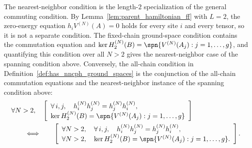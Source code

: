 \begin{remark}
    \label{rem:nncph_ground_spaces_decomposition}
    \leanok
    The nearest-neighbor condition is the length-$2$ specialization of the
    general commuting condition. By Lemma~\ref{lem:parent_hamiltonian_ff}
    with $L=2$, the zero-energy equation $h_iV^{(N)}(A)=0$ holds for every
    site $i$ and every tensor, so it is not a separate condition. The
    fixed-chain ground-space condition contains the commutation equation and
    $\ker H_2^{(N)}(B) = \spn\{V^{(N)}(A_j):j=1,\ldots,g\}$,
    and quantifying this condition over all $N>2$ gives the nearest-neighbor
    case of the spanning condition above.
    Conversely, the all-chain condition in
    Definition~\ref{def:has_nncph_ground_spaces} is the conjunction of the
    all-chain commutation equations and the nearest-neighbor instance of the
    spanning condition above:
    \begin{align}
         & \forall N>2,\quad
        \left[\begin{array}{l}
                      \forall\, i,j,\quad
                      h_i^{(N)}h_j^{(N)}=h_j^{(N)}h_i^{(N)}, \\
                      \ker H_2^{(N)}(B)
                      =
                      \spn\{V^{(N)}(A_j):j=1,\ldots,g\}
                  \end{array}\right]
        \notag                             \\
         & \qquad\Longleftrightarrow\qquad
        \left[\begin{array}{l}
                      \forall N>2,\quad
                      \forall\, i,j,\quad
                      h_i^{(N)}h_j^{(N)}=h_j^{(N)}h_i^{(N)}, \\
                      \forall N>2,\quad
                      \ker H_2^{(N)}(B)
                      =
                      \spn\{V^{(N)}(A_j):j=1,\ldots,g\}.
                  \end{array}\right].
        \notag
    \end{align}
\end{remark}

